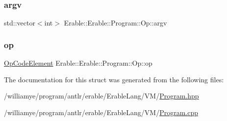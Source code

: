 \subsubsection{\texorpdfstring{argv}{argv}}
{\footnotesize\ttfamily std\+::vector$<$int$>$ Erable\+::\+Erable\+::\+Program\+::\+Op\+::argv}

\mbox{\label{struct_erable_1_1_erable_1_1_program_1_1_op_ad908a223827b7846bc7a5a0b5b43c895}} 
\subsubsection{\texorpdfstring{op}{op}}
{\footnotesize\ttfamily \mbox{\hyperlink{class_erable_1_1_op_code_element}{Op\+Code\+Element}} Erable\+::\+Erable\+::\+Program\+::\+Op\+::op}



The documentation for this struct was generated from the following files\+:\begin{DoxyCompactItemize}
\item 
/williamye/program/antlr/erable/\+Erable\+Lang/\+V\+M/\mbox{\hyperlink{_program_8hpp}{Program.\+hpp}}\item 
/williamye/program/antlr/erable/\+Erable\+Lang/\+V\+M/\mbox{\hyperlink{_program_8cpp}{Program.\+cpp}}\end{DoxyCompactItemize}

